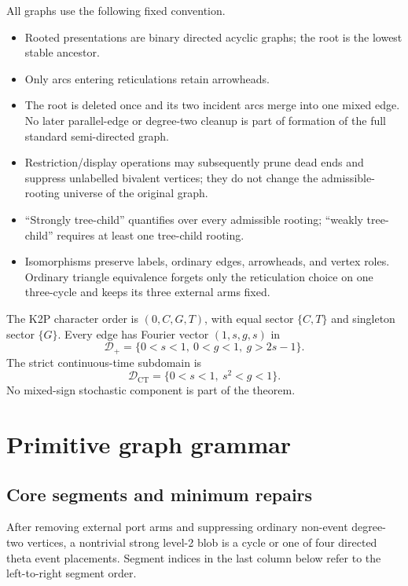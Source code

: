 \documentclass[11pt]{article}
\theoremstyle{remark}
\newcommand{\Dplus}{\mathcal D_+}
\newcommand{\Dct}{\mathcal D_{\mathrm{CT}}}
\begin{document}
All graphs use the following fixed convention.
\begin{itemize}
  \item Rooted presentations are binary directed acyclic graphs; the root is
        the lowest stable ancestor.
  \item Only arcs entering reticulations retain arrowheads.
  \item The root is deleted once and its two incident arcs merge into one
        mixed edge.  No later parallel-edge or degree-two cleanup is part of
        formation of the full standard semi-directed graph.
  \item Restriction/display operations may subsequently prune dead ends and
        suppress unlabelled bivalent vertices; they do not change the
        admissible-rooting universe of the original graph.
  \item ``Strongly tree-child'' quantifies over every admissible rooting;
        ``weakly tree-child'' requires at least one tree-child rooting.
  \item Isomorphisms preserve labels, ordinary edges, arrowheads, and vertex
        roles.  Ordinary triangle equivalence forgets only the reticulation
        choice on one three-cycle and keeps its three external arms fixed.
\end{itemize}

The K2P character order is \((0,C,G,T)\), with equal sector \(\{C,T\}\)
and singleton sector \(\{G\}\).  Every edge has Fourier vector
\((1,s,g,s)\) in
\[
 \Dplus=\{0<s<1,\ 0<g<1,\ g>2s-1\}.
\]
The strict continuous-time subdomain is
\[
 \Dct=\{0<s<1,\ s^2<g<1\}.
\]
No mixed-sign stochastic component is part of the theorem.

\section{Primitive graph grammar}\label{sec:grammar}

\subsection{Core segments and minimum repairs}

After removing external port arms and suppressing ordinary non-event degree-two
vertices, a nontrivial strong level-2 blob is a cycle or one of four directed
theta event placements.  Segment indices in the last column below refer to the
left-to-right segment order.
\end{document}
